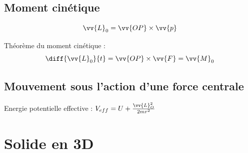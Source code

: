 \documentclass[landscape,a4paper]{article}
\newcommand{\F}{\ensuremath{\vv{F}}}
\newcommand{\vi}{\ensuremath{\vv{v}}}
\newcommand{\vian}{\ensuremath{\vv{\omega}}}
\newcommand{\mc}{\ensuremath{\vv{L}}}
\newcommand{\mf}{\ensuremath{\vv{M}}}
\begin{document}
\begin{multicols}{4}
  \subsection{Moment cinétique}
  \[
    \vv{L}_0=\vv{OP}\times\vv{p}
  \]

  Théorème du moment cinétique :
  \[
    \diff{\vv{L}_0}{t}=\vv{OP}\times\F=\vv{M}_0
  \]


  \subsection{Mouvement sous l'action d'une force centrale}
  Energie potentielle effective : \(V_{eff}=U+\frac{\mc_O^2}{2mr^2}\)


  \section{Solide en 3D}

\end{multicols}
\end{document}
